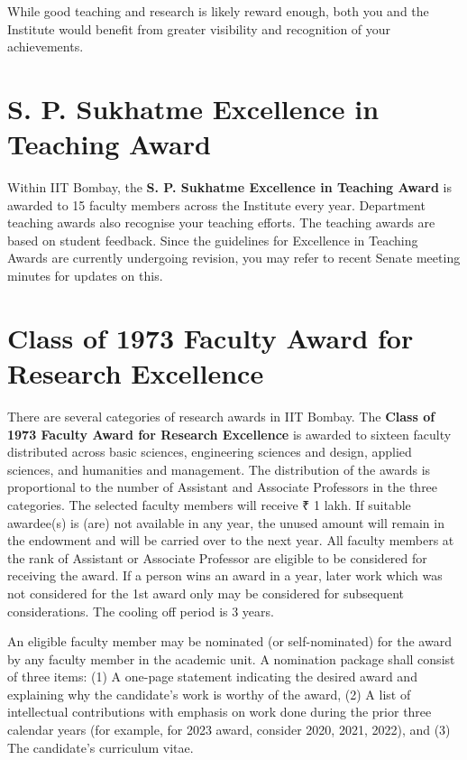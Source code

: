 \documentclass[
  10pt,
  a5paper,
  10pt,
  openany]{amsbook}
\begin{document}
While good teaching and research is likely reward enough, both you and
the Institute would benefit from greater visibility and recognition of
your achievements.

\section{S. P. Sukhatme Excellence in Teaching
Award}\label{s.-p.-sukhatme-excellence-in-teaching-award}

Within IIT Bombay, the \textbf{S. P. Sukhatme Excellence in Teaching
Award} is awarded to 15 faculty members across the Institute every year.
Department teaching awards also recognise your teaching efforts. The
teaching awards are based on student feedback. Since the guidelines for
Excellence in Teaching Awards are currently undergoing revision, you may
refer to recent Senate meeting minutes for updates on this.

\section{Class of 1973 Faculty Award for Research
Excellence}\label{class-of-1973-faculty-award-for-research-excellence}

There are several categories of research awards in IIT Bombay. The
\textbf{Class of 1973 Faculty Award for Research Excellence} is awarded
to sixteen faculty distributed across basic sciences, engineering
sciences and design, applied sciences, and humanities and management.
The distribution of the awards is proportional to the number of
Assistant and Associate Professors in the three categories. The selected
faculty members will receive ₹‎ 1 lakh. If suitable awardee(s) is (are)
not available in any year, the unused amount will remain in the
endowment and will be carried over to the next year. All faculty members
at the rank of Assistant or Associate Professor are eligible to be
considered for receiving the award. If a person wins an award in a year,
later work which was not considered for the 1st award only may be
considered for subsequent considerations. The cooling off period is 3
years.

An eligible faculty member may be nominated (or self-nominated) for the
award by any faculty member in the academic unit. A nomination package
shall consist of three items: (1) A one-page statement indicating the
desired award and explaining why the candidate's work is worthy of the
award, (2) A list of intellectual contributions with emphasis on work
done during the prior three calendar years (for example, for 2023 award,
consider 2020, 2021, 2022), and (3) The candidate's curriculum vitae.
\end{document}
